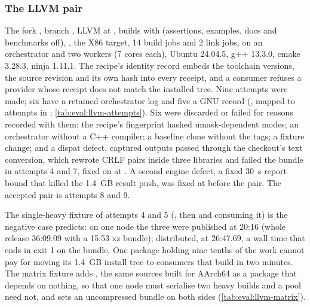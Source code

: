 \subsubsection{The LLVM pair}
\label{sec:eval:rq5:llvm}

The fork , branch , LLVM
 at , builds with  (assertions,
examples, docs and benchmarks off), , the X86
target, 14 build jobs and 2 link jobs, on an  orchestrator
and two  workers (7 cores each), Ubuntu 24.04.5,
g++ 13.3.0, cmake 3.28.3, ninja 1.11.1. The recipe's identity record embeds
the toolchain versions, the source revision and its own hash into every
receipt, and a consumer refuses a provider whose receipt does not match the
installed tree. Nine attempts were made; six have a retained orchestrator log
and five a GNU  record (, mapped
to attempts in ; \cref{tab:eval:llvm-attempts}). Six
were discarded or failed for reasons recorded with them: the recipe's
fingerprint hashed umask-dependent modes; an orchestrator without a C++
compiler; a baseline clone without the  tags; a fixture change;
and a dispat defect, captured outputs passed through the checkout's
 text conversion, which rewrote CRLF pairs inside three
libraries and failed the bundle in attempts 4 and 7, fixed on  at
. A second engine defect, a fixed 30~s report bound that killed
the 1.4~GB result push, was fixed at  before the pair. The
accepted pair is attempts 8 and 9.

The single-heavy fixture of attempts 4 and 5 (, then 
and  consuming it) is the negative case  predicts: on
one node the three were published at 20:16 (whole release 36:09.09 with a
15:53 xz bundle); distributed, at 26:47.69, a wall time that ends in exit 1 on
the bundle. One package holding nine tenths of the work cannot pay for moving
its 1.4~GB install tree to consumers that build in two minutes. The matrix
fixture adds , the same sources built for AArch64 as a
package that depends on nothing, so that one node must serialise two heavy
builds and a pool need not, and sets an uncompressed bundle on both sides
(\cref{tab:eval:llvm-matrix}).

